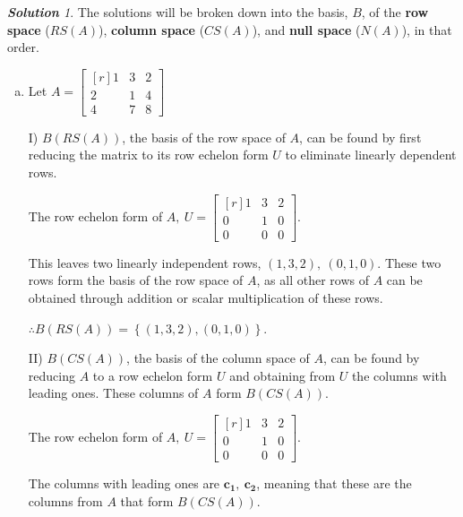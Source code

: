 \documentclass[12pt, letterpaper]{article}
\theoremstyle{remark}
\theoremstyle{remark}
\newtheorem*{solution}{\textbf{Solution}}
\begin{document}
\begin{solution}

	The solutions will be broken down into the basis, $B$, of
	the \textbf{row space} ($RS(A)$), \textbf{column space} ($CS(A)$), and
	\textbf{null space} ($N(A)$), in that
	order.

	\begin{enumerate}[(a)]
		\item Let \( A =
		      \begin{bmatrix*}[r]
			      1 & 3 & 2 \\
			      2 & 1 & 4 \\
			      4 & 7 & 8
		      \end{bmatrix*}
		      \)

		      \bigskip

		      I) \(B(RS(A))\), the basis of the row space of $A$, can be found by
		      first reducing the matrix to its row echelon form $U$ to
		      eliminate linearly dependent rows.

		      The row echelon form of \(A,\ U =
		      \begin{bmatrix*}[r]
			      1 & 3 & 2 \\
			      0 & 1 & 0 \\
			      0 & 0 & 0
		      \end{bmatrix*}
		      \).

		      This leaves two linearly independent rows, \((1, 3, 2),\ (0, 1, 0)\).
		      These two rows form the basis of the row space of $A$, as all other
		      rows of $A$ can be obtained through addition or scalar multiplication
		      of these rows.

		      \(\therefore B(RS(A)) = \left\{(1, 3, 2),(0, 1, 0)\right\}\).

		      \pagebreak

		      II) \(B(CS(A))\), the basis of the column space of $A$, can be found
		      by reducing $A$ to a row echelon form $U$ and obtaining from $U$ the
		      columns with leading ones. These columns of $A$ form \(B(CS(A))\).

		      The row echelon form of \(A,\ U =
		      \begin{bmatrix*}[r]
			      1 & 3 & 2 \\
			      0 & 1 & 0 \\
			      0 & 0 & 0
		      \end{bmatrix*}
		      \).

		      The columns with leading ones are \(\bm{c_1},\ \bm{c_2}\), meaning
		      that these are the columns from \(A\) that form \(B(CS(A))\).


\end{enumerate}
\end{solution}
\end{document}
